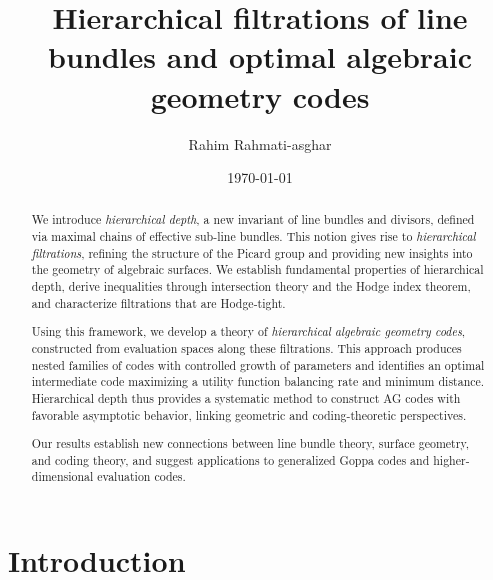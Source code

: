 \documentclass[14pt]{amsart}
\theoremstyle{plain}
\theoremstyle{definition}
\theoremstyle{remark}
\theoremstyle{example}
\begin{document}
\title[Hierarchical filtrations of line bundles and optimal AG codes]{Hierarchical filtrations of line bundles and optimal algebraic geometry codes}
\author{Rahim Rahmati-asghar}



\makeatletter


\date{\today}

\begin{abstract}
We introduce \emph{hierarchical depth}, a new invariant of line bundles and divisors, defined via maximal chains of effective sub-line bundles. This notion gives rise to \emph{hierarchical filtrations}, refining the structure of the Picard group and providing new insights into the geometry of algebraic surfaces. We establish fundamental properties of hierarchical depth, derive inequalities through intersection theory and the Hodge index theorem, and characterize filtrations that are Hodge-tight.

Using this framework, we develop a theory of \emph{hierarchical algebraic geometry codes}, constructed from evaluation spaces along these filtrations. This approach produces nested families of codes with controlled growth of parameters and identifies an optimal intermediate code maximizing a utility function balancing rate and minimum distance. Hierarchical depth thus provides a systematic method to construct AG codes with favorable asymptotic behavior, linking geometric and coding-theoretic perspectives.

Our results establish new connections between line bundle theory, surface geometry, and coding theory, and suggest applications to generalized Goppa codes and higher-dimensional evaluation codes.
\end{abstract}


\maketitle


\section*{Introduction}
\end{document}
